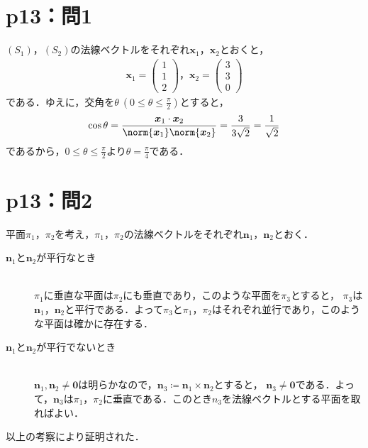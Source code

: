 \section*{p13：問1}
%
\begin{tanswer}
  $(S_1)$，$(S_2)$の法線ベクトルをそれぞれ$\bm{x}_1$，$\bm{x}_2$とおくと，
  \begin{gather*}
    \bm{x}_1 =
    \begin{pmatrix}
      1 \\
      1 \\
      2
    \end{pmatrix}
    ，
    \bm{x}_2 =
    \begin{pmatrix}
      3 \\
      3 \\
      0
    \end{pmatrix}
  \end{gather*}
  である．ゆえに，交角を$\theta ~(0 \le \theta \le \frac{\pi}{2})$とすると，
  \[
    \cos \theta = \frac{\bm{x}_1 \cdot \bm{x}_2}{\norm{\bm{x}_1} \norm{\bm{x}_2}}=\frac{3}{3\sqrt{2}}=\frac{1}{\sqrt{2}}
  \]
  であるから，$0 \le \theta \le \frac{\pi}{2}$より$\theta =\frac{\pi}{4}$である．
\end{tanswer}
%
\section*{p13：問2}

\begin{tproof}
  平面$\pi_1$，$\pi_2$を考え，$\pi_1$，$\pi_2$の法線ベクトルをそれぞれ$\bm{n}_1$，$\bm{n}_2$とおく．
  \begin{description}
    \item[$\bm{n}_1$と$\bm{n}_2$が平行なとき] \mbox{}\\
          $\pi_1$に垂直な平面は$\pi_2$にも垂直であり，このような平面を$\pi_3$とすると，
          $\pi_3$は$\bm{n}_1$，$\bm{n}_2$と平行である．よって$\pi_3$と$\pi_1$，$\pi_2$はそれぞれ並行であり，このような平面は確かに存在する．
    \item[$\bm{n}_1$と$\bm{n}_2$が平行でないとき] \mbox{} \\
          $\bm{n}_1 , \bm{n}_2 \ne \bm{0}$は明らかなので，$\bm{n}_3 \coloneqq \bm{n}_1 \times \bm{n}_2$とすると，
          $\bm{n}_3 \ne \bm{0}$である．よって，$\bm{n}_3$は$\pi_1$，$\pi_2$に垂直である．このとき$n_3$を法線ベクトルとする平面を取ればよい．
  \end{description}
  以上の考察により証明された．
\end{tproof}

